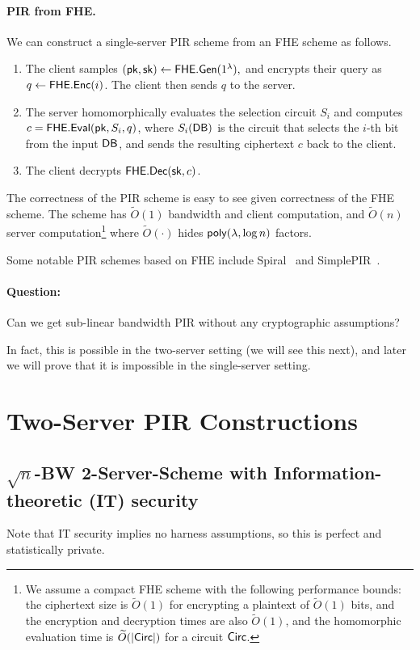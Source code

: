 \paragraph{PIR from FHE.}
We can construct a single-server PIR scheme from an FHE scheme 
as follows.
\begin{enumerate}
	\item The client samples $({\sf pk},{\sf sk}) \leftarrow {\sf FHE}.{\sf Gen}(1^\lambda),$ and encrypts their query as $q \leftarrow {\sf FHE}.{\sf Enc}(i)$. The client then sends $q$ to the server.
	\item The server homomorphically evaluates the selection circuit $S_i$ 
and computes ${c} = {\sf FHE}.{\sf Eval}({\sf pk}, S_i, q)$, where $S_i({\sf DB})$ 
is the circuit that selects the $i$-th bit from the input ${\sf DB}$, 
and sends the resulting ciphertext $c$ back to the client. 
	\item The client decrypts ${\sf FHE}.{\sf Dec}({\sf sk}, c)$.
\end{enumerate}
The correctness of the PIR scheme is easy to see
given correctness of the FHE scheme. 
The scheme has $\widetilde{O}(1)$ bandwidth and 
client computation, and $\widetilde{O}(n)$ 
server computation\footnote{We assume a compact
FHE scheme with the following
performance bounds: 
the ciphertext size is 
$\widetilde{O}(1)$ for encrypting a plaintext
of $\widetilde{O}(1)$ bits, and the encryption
and decryption times are also $\widetilde{O}(1)$, 
and the homomorphic evaluation
time
is $\widetilde{O}(|{\sf Circ}|)$
 for a circuit ${\sf Circ}$.} 
where $\widetilde{O}(\cdot)$ hides
${\sf poly}(\lambda, \log n)$ factors.


Some notable PIR schemes based on FHE 
include Spiral~\cite{spiral} 
and SimplePIR~\cite{simplepir}.

\paragraph{Question:} Can we get sub-linear bandwidth PIR 
without any cryptographic assumptions? 

In fact, this is possible in the two-server setting (we will see this next), 
and later we will prove that it is impossible in the single-server setting.

\section{Two-Server PIR Constructions}
\subsection{$\sqrt{n}$-BW 2-Server-Scheme with Information-theoretic (IT) security}
Note that IT security implies no harness assumptions, so this is perfect and statistically private.

